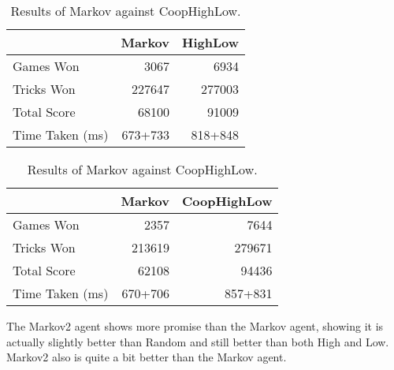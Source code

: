 \begin{table}[ht]
    \begin{minipage}{.5\linewidth}
        \centering
        \begin{tabular}{l|rr}
            ~               &   Markov &   HighLow  \\  \hline
            Games Won       &   3067        &   6934   \\
            Tricks Won      &   227647      &   277003 \\
            Total Score     &   68100       &   91009  \\
            Time Taken (ms) &   673+733   &   818+848
        \end{tabular}
        \caption{Results of Markov against HighLow.}
        \label{tab:markov_highlow}
    \end{minipage}%
    \begin{minipage}{.5\linewidth}
        \centering
        \begin{tabular}{l|rr}
            ~               &   Markov &   CoopHighLow  \\  \hline
            Games Won       &   2357        &   7644   \\
            Tricks Won      &   213619      &   279671 \\
            Total Score     &   62108       &   94436  \\
            Time Taken (ms) &   670+706   &   857+831
        \end{tabular}
        \caption{Results of Markov against CoopHighLow.}
        \label{tab:markov_coophighlow}
    \end{minipage} 
\end{table}



The Markov2 agent shows more promise than the Markov agent, showing it is actually slightly better than Random and still better
than both High and Low. Markov2 also is quite a bit better than the Markov agent.

